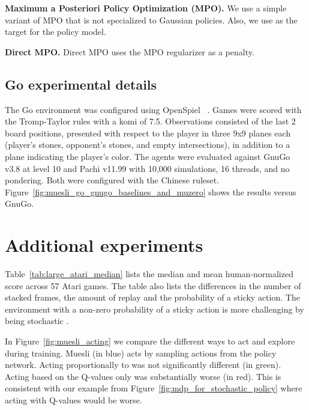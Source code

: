 \documentclass{article}
\begin{document}
\textbf{Maximum a Posteriori Policy Optimization (MPO).}
We use a simple variant of MPO \cite{abdolmaleki2018maximum} that is not specialized to Gaussian policies.
Also, we use  as the target for the policy model.



\textbf{Direct MPO.} Direct MPO uses the MPO regularizer  as a penalty.



\subsection{Go experimental details}

The Go environment was configured using OpenSpiel ~\cite{LanctotEtAl2019OpenSpiel}. Games were scored with the Tromp-Taylor rules with a komi of 7.5. Observations consisted of the last 2 board positions, presented with respect to the player in three 9x9 planes each (player's stones, opponent's stones, and empty intersections), in addition to a plane indicating the player's color. The agents were evaluated against GnuGo v3.8 at level 10 \cite{GnuGo2005} and Pachi v11.99 \cite{baudivs2011pachi} with 10,000 simulations, 16 threads, and no pondering. Both were configured with the Chinese ruleset. Figure~\ref{fig:muesli_go_gnugo_baselines_and_muzero} shows the results versus GnuGo.

\section{Additional experiments}
\label{sec:appendix_experiments}

Table~\ref{tab:large_atari_median} lists the median and mean human-normalized score across 57 Atari games. The table also lists the differences in the number of stacked frames, the amount of replay and the probability of a sticky action. The environment with a non-zero probability of a sticky action is more challenging by being stochastic \citep{machado2018revisiting}.

In Figure~\ref{fig:muesli_acting} we compare the different ways to act and explore during training. Muesli (in blue) acts by sampling actions from 
the policy network. Acting proportionally to  was not significantly different (in green). Acting based on the Q-values only was substantially worse (in red). This is consistent with our example from Figure~\ref{fig:mdp_for_stochastic_policy} where acting with Q-values would be worse.
\end{document}
